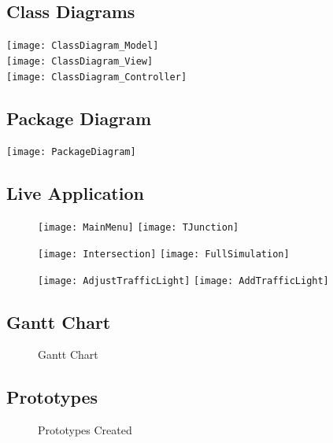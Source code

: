 \documentclass[11pt]{article}
\begin{document}
\subsection{Class Diagrams}
\begin{center}
\texttt{[image: ClassDiagram\_Model]}\\


\texttt{[image: ClassDiagram\_View]}\\


\texttt{[image: ClassDiagram\_Controller]}\\

\end{center}

\subsection{Package Diagram}
\texttt{[image: PackageDiagram]}
\restoregeometry

\subsection{Live Application}


\begin{figure}[!htb]
\centering
\texttt{[image: MainMenu]}
\texttt{[image: TJunction]}

\end{figure}

\begin{figure}[!htb]
\centering
\texttt{[image: Intersection]}
\texttt{[image: FullSimulation]}
\end{figure}

\begin{figure}[!htb]
\centering
\texttt{[image: AdjustTrafficLight]}
\texttt{[image: AddTrafficLight]}

\end{figure}


\restoregeometry

\subsection{Gantt Chart}
\begin{figure}[[!htb]
	\setlength\fboxsep{0pt}
	\setlength\fboxrule{1pt}
	\caption{Gantt Chart}
	\label{fig:GanttChart}
\end{figure}
\newpage
\subsection{Prototypes}
	\begin{figure}[!htb]
		\centering
		\caption[short for lof]{Prototypes Created}
		\label{fig:Prototypes}
	\end{figure}
	
\end{document}
